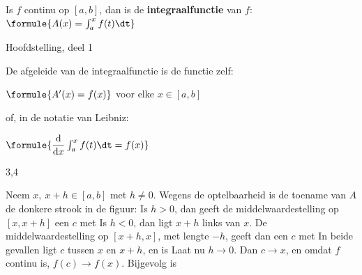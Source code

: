 \begin{theorie}
Is $f$ continu op $[a, b]$, dan is de \textbf{\textcolor{accent}{integraalfunctie}} van $f$: \quad $\formule{A(x) = \int_a^x f(t)\dt}$

\begin{stelling}{Hoofdstelling, deel 1}
\begin{minipage}[t]{.62\linewidth}
\vspace{0pt}
De afgeleide van de integraalfunctie is de functie zelf:

\vspace{1mm}
\qquad $\formule{A'(x) = f(x)}$ \quad voor elke $x \in [a, b]$

\vspace{1.5mm}
of, in de notatie van Leibniz:

\vspace{1mm}
\qquad $\formule{\dfrac{\mathrm{d}}{\mathrm{d}x} \int_a^x f(t)\dt = f(x)}$
\end{minipage}\hfill
\begin{minipage}[t]{.34\linewidth}
\vspace{0pt}
\end{minipage}
\end{stelling}

\begin{alleenvoor}{3,4}
\begin{bewijs}
Neem $x,\ x + h \in [a, b]$ met $h \neq 0$. Wegens de optelbaarheid is de toename van $A$ de donkere strook in de figuur:
Is $h > 0$, dan geeft de middelwaardestelling op $[x, x + h]$ een $c$ met
Is $h < 0$, dan ligt $x + h$ links van $x$. De middelwaardestelling op $[x + h, x]$, met lengte $-h$, geeft dan een $c$ met
In beide gevallen ligt $c$ tussen $x$ en $x + h$, en is
Laat nu $h \to 0$. Dan $c \to x$, en omdat $f$ continu is, $f(c) \to f(x)$. Bijgevolg is
\end{bewijs}
\end{alleenvoor}
\end{theorie}

